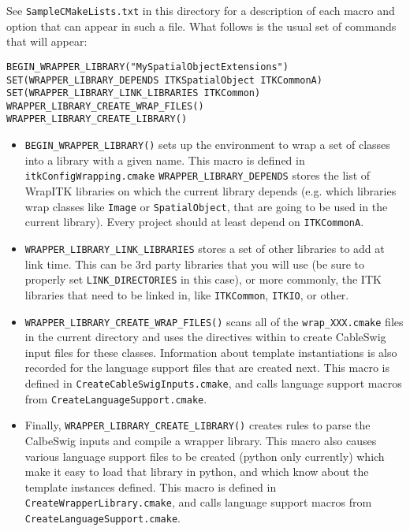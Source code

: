 \documentclass{InsightArticle}
\begin{document}
See \verb$SampleCMakeLists.txt$ in this directory for a description of each macro and
option that can appear in such a file. What follows is the usual set of commands
that will appear:

\small \begin{verbatim}
BEGIN_WRAPPER_LIBRARY("MySpatialObjectExtensions")
SET(WRAPPER_LIBRARY_DEPENDS ITKSpatialObject ITKCommonA)
SET(WRAPPER_LIBRARY_LINK_LIBRARIES ITKCommon)
WRAPPER_LIBRARY_CREATE_WRAP_FILES()
WRAPPER_LIBRARY_CREATE_LIBRARY()
\end{verbatim} \normalsize

\begin{itemize}
  \item \verb$BEGIN_WRAPPER_LIBRARY()$ sets up the environment to wrap a set of classes into a
library with a given name. This macro is defined in \verb$itkConfigWrapping.cmake$
\verb$WRAPPER_LIBRARY_DEPENDS$ stores the list of WrapITK libraries on which the
current library depends (e.g. which libraries wrap classes like \verb$Image$ or
\verb$SpatialObject$, that are going to be used in the current library). Every project
should at least depend on \verb$ITKCommonA$.

  \item \verb$WRAPPER_LIBRARY_LINK_LIBRARIES$ stores a set of other libraries to add at link
time. This can be 3rd party libraries that you will use (be sure to properly set
\verb$LINK_DIRECTORIES$ in this case), or more commonly, the ITK libraries that need to
be linked in, like \verb$ITKCommon$, \verb$ITKIO$, or other. 

  \item \verb$WRAPPER_LIBRARY_CREATE_WRAP_FILES()$ scans all of the \verb$wrap_XXX.cmake$ files in the
current directory and uses the directives within to create CableSwig input files
for these classes. Information about template instantiations is also recorded
for the language support files that are created next. This macro is defined in
\verb$CreateCableSwigInputs.cmake$, and calls language support macros from
\verb$CreateLanguageSupport.cmake$.

  \item Finally, \verb$WRAPPER_LIBRARY_CREATE_LIBRARY()$ creates rules to parse the CalbeSwig
inputs and compile a wrapper library. This macro also causes various language
support files to be created (python only currently) which make it easy to load
that library in python, and which know about the template instances defined.
This macro is defined in \verb$CreateWrapperLibrary.cmake$, and calls language support
macros from \verb$CreateLanguageSupport.cmake$.
\end{itemize}
\end{document}
